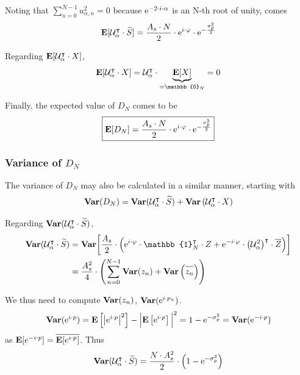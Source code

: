 Noting that $\sum_{n=0}^{N-1} u_{\alpha,n}^2 = 0$ because $\mathrm{e}^{-2 \cdot i\cdot \alpha}$ is an N-th root of unity, comes
\begin{equation}\label{eq:choos:apsipa:after_cyclo}
	\mathbf{E}[\mathcal{U}_\alpha^\intercal\cdot \widetilde{S}] = \frac{A_s \cdot N}{2} \cdot \mathrm{e}^{i \cdot \varphi} \cdot \mathrm{e}^{- \frac{\sigma_p^2}{2}}
\end{equation}

Regarding $\mathbf{E}[\mathcal{U}_\alpha^\intercal\cdot X ]$,
\begin{equation}
	\esp[\mathcal{U}_\alpha^\intercal\cdot X ] = \mathcal{U}_\alpha^\intercal\cdot \underbrace{\esp[X]}_{=\mathbb{0}_N} = 0
\end{equation}

Finally, the expected value of $D_N$ comes to be
\begin{equation}
	\boxed{\mathbf{E}[D_N] = \frac{A_s \cdot N}{2} \cdot \mathrm{e}^{i \cdot \varphi} \cdot \mathrm{e}^{- \frac{\sigma_p^2}{2}}}
\end{equation}

\subsubsection{Variance of \texorpdfstring{$D_N$}{DN}}\label{subsect:choos:apsipa:dvar_ideal}

The variance of $D_N$ may also be calculated in a similar manner, starting with
\begin{equation}\label{eq:choos:apsipa:esp_bbg_null}
	\mathbf{Var}(D_N) = \mathbf{Var}(\mathcal{U}_\alpha^\intercal\cdot \widetilde{S} ) + \mathbf{Var}\left(\mathcal{U}_\alpha^\intercal\cdot X\right)
\end{equation}

Regarding $\mathbf{Var}(\mathcal{U}_\alpha^\intercal\cdot \widetilde{S} )$,
\begin{equation}
	\begin{aligned}
		\var(\mathcal{U}_\alpha^\intercal\cdot \widetilde{S}) &= 
		\var \biggl[ \frac{A_s}{2} \cdot \Bigl( \e^{i \cdot \varphi} \cdot \mathbb{1}_N^\intercal\cdot Z  + \e^{-i\cdot \varphi} \cdot \left(\mathcal{U}_{\alpha}^2\right)^\intercal \cdot \conj{Z} \Bigr) \biggr]
		\\
		&= \frac{A_s^2}{4} \cdot \left(\sum_{n=0}^{N-1} \var(z_n) + \var \left(\conj{z_n}\right) \right)
	\end{aligned}
\end{equation}

We thus need to compute $\mathbf{Var}(z_n)$, \ie{} $\mathbf{Var}(\mathrm{e}^{i\cdot p_n})$.
\begin{equation}
	\mathbf{Var}(\mathrm{e}^{i \cdot p}) = \mathbf{E}\left[\left|\mathrm{e}^{i\cdot p}\right|^2\right] - \Big|\mathbf{E}\left[\mathrm{e}^{i\cdot p}\right]\Big|^2
	= 1 - \mathrm{e}^{-\sigma_p^2} = \mathbf{Var}(\mathrm{e}^{-i \cdot p})
\end{equation}
as $\mathbf{E}[e^{-i\cdot p}] = \overline{\mbox{$\mathbf{E}[e^{i\cdot p}]$\mathstrut}}$. Thus
\begin{equation}
	\mathbf{Var}(\mathcal{U}_\alpha^\intercal\cdot \widetilde{S}) 
	= \frac{N \cdot A_s^2}{2} \cdot \left(1 - \mathrm{e}^{-\sigma_p^2}\right)
\end{equation}

